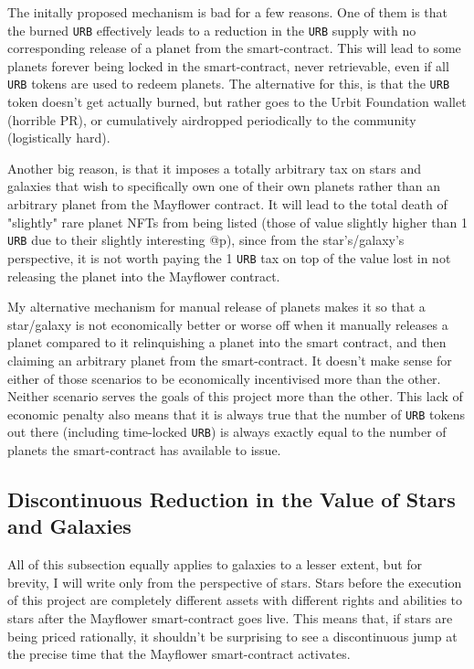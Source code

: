 \documentclass{article}
\begin{document}
	The initally proposed mechanism is bad for a few reasons. One of them is that the burned \texttt{URB} effectively leads to a reduction in the \texttt{URB} supply with no corresponding release of a planet from the smart-contract. This will lead to some planets forever being locked in the smart-contract, never retrievable, even if all \texttt{URB} tokens are used to redeem planets. The alternative for this, is that the \texttt{URB} token doesn't get actually burned, but rather goes to the Urbit Foundation wallet (horrible PR), or cumulatively airdropped periodically to the community (logistically hard).
	
	Another big reason, is that it imposes a totally arbitrary tax on stars and galaxies that wish to specifically own one of their own planets rather than an arbitrary planet from the Mayflower contract. It will lead to the total death of "slightly" rare planet NFTs from being listed (those of value slightly higher than 1 \texttt{URB} due to their slightly interesting @p), since from the star's/galaxy's perspective, it is not worth paying the 1 \texttt{URB} tax on top of the value lost in not releasing the planet into the Mayflower contract. 
	
	My alternative mechanism for manual release of planets makes it so that a star/galaxy is not economically better or worse off when it manually releases a planet compared to it relinquishing a planet into the smart contract, and then claiming an arbitrary planet from the smart-contract. It doesn't make sense for either of those scenarios to be economically incentivised more than the other. Neither scenario serves the goals of this project more than the other. This lack of economic penalty also means that it is always true that the number of \texttt{URB} tokens out there (including time-locked \texttt{URB}) is always exactly equal to the number of planets the smart-contract has available to issue.
	
	
	\subsection{Discontinuous Reduction in the Value of Stars and Galaxies}
	All of this subsection equally applies to galaxies to a lesser extent, but for brevity, I will write only from the perspective of stars. Stars before the execution of this project are completely different assets with different rights and abilities to stars after the Mayflower smart-contract goes live. This means that, if stars are being priced rationally, it shouldn't be surprising to see a discontinuous jump at the precise time that the Mayflower smart-contract activates. 
	
\end{document}

